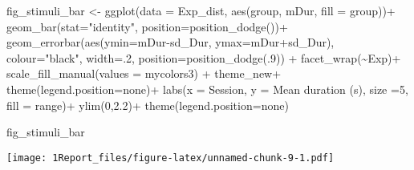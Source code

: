 \documentclass[
]{article}
\newenvironment{Shaded}{\begin{snugshade}}{\end{snugshade}}
\newcommand{\AttributeTok}[1]{\textcolor[rgb]{0.77,0.63,0.00}{#1}}
\newcommand{\DecValTok}[1]{\textcolor[rgb]{0.00,0.00,0.81}{#1}}
\newcommand{\FloatTok}[1]{\textcolor[rgb]{0.00,0.00,0.81}{#1}}
\newcommand{\FunctionTok}[1]{\textcolor[rgb]{0.00,0.00,0.00}{#1}}
\newcommand{\NormalTok}[1]{#1}
\newcommand{\OtherTok}[1]{\textcolor[rgb]{0.56,0.35,0.01}{#1}}
\newcommand{\SpecialCharTok}[1]{\textcolor[rgb]{0.00,0.00,0.00}{#1}}
\newcommand{\StringTok}[1]{\textcolor[rgb]{0.31,0.60,0.02}{#1}}
\begin{document}
\begin{Shaded}
\begin{Highlighting}[]
\NormalTok{fig\_stimuli\_bar }\OtherTok{\textless{}{-}} \FunctionTok{ggplot}\NormalTok{(}\AttributeTok{data =}\NormalTok{ Exp\_dist, }\FunctionTok{aes}\NormalTok{(group, mDur, }\AttributeTok{fill =}\NormalTok{ group))}\SpecialCharTok{+}
  \FunctionTok{geom\_bar}\NormalTok{(}\AttributeTok{stat=}\StringTok{"identity"}\NormalTok{, }\AttributeTok{position=}\FunctionTok{position\_dodge}\NormalTok{())}\SpecialCharTok{+}
  \FunctionTok{geom\_errorbar}\NormalTok{(}\FunctionTok{aes}\NormalTok{(}\AttributeTok{ymin=}\NormalTok{mDur}\SpecialCharTok{{-}}\NormalTok{sd\_Dur, }\AttributeTok{ymax=}\NormalTok{mDur}\SpecialCharTok{+}\NormalTok{sd\_Dur), }\AttributeTok{colour=}\StringTok{"black"}\NormalTok{, }\AttributeTok{width=}\NormalTok{.}\DecValTok{2}\NormalTok{, }\AttributeTok{position=}\FunctionTok{position\_dodge}\NormalTok{(.}\DecValTok{9}\NormalTok{)) }\SpecialCharTok{+} 
  \FunctionTok{facet\_wrap}\NormalTok{(}\SpecialCharTok{\textasciitilde{}}\NormalTok{Exp)}\SpecialCharTok{+}
  \FunctionTok{scale\_fill\_manual}\NormalTok{(}\AttributeTok{values =}\NormalTok{ mycolors3) }\SpecialCharTok{+}
\NormalTok{  theme\_new}\SpecialCharTok{+} \FunctionTok{theme}\NormalTok{(}\AttributeTok{legend.position=}\StringTok{\textquotesingle{}none\textquotesingle{}}\NormalTok{)}\SpecialCharTok{+}
  \FunctionTok{labs}\NormalTok{(}\AttributeTok{x =} \StringTok{\textquotesingle{}Session\textquotesingle{}}\NormalTok{, }\AttributeTok{y =} \StringTok{\textquotesingle{}Mean duration (s)\textquotesingle{}}\NormalTok{, }\AttributeTok{size =}\DecValTok{5}\NormalTok{,  }\AttributeTok{fill =} \StringTok{\textquotesingle{}range\textquotesingle{}}\NormalTok{)}\SpecialCharTok{+}
  \FunctionTok{ylim}\NormalTok{(}\DecValTok{0}\NormalTok{,}\FloatTok{2.2}\NormalTok{)}\SpecialCharTok{+} \FunctionTok{theme}\NormalTok{(}\AttributeTok{legend.position=}\StringTok{\textquotesingle{}none\textquotesingle{}}\NormalTok{)}

\NormalTok{fig\_stimuli\_bar}
\end{Highlighting}
\end{Shaded}

\texttt{[image: 1Report\_files/figure-latex/unnamed-chunk-9-1.pdf]}
\end{document}

